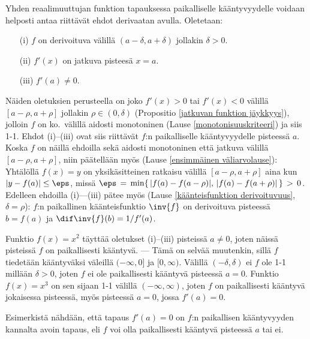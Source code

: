 Yhden reaalimuuttujan funktion tapauksessa paikalliselle kääntyvyydelle voidaan helposti antaa
riittävät ehdot derivaatan avulla. Oletetaan:
\begin{itemize}
\item[(i)]   $f$ on derivoituva välillä $(a-\delta,a+\delta)$ jollakin $\delta>0$.
\item[(ii)]  $f'(x)$ on jatkuva pisteesä $x=a$.
\item[(iii)] $f'(a) \neq 0$.
\end{itemize}
Näiden oletuksien perusteella on joko $f'(x)>0$ tai $f'(x)<0$ välillä $[a-\rho,a+\rho]$
jollakin $\rho\in(0,\delta)$ (Propositio \ref{jatkuvan funktion jäykkyys}), jolloin $f$ on
ko.\ välillä aidosti monotoninen (Lause \ref{monotonisuuskriteeri}) ja siis 1-1. Ehdot
(i)--(iii) ovat siis riittävät $f$:n paikalliselle kääntyvyydelle pisteessä $a$. Koska $f$ on
näillä ehdoilla sekä aidosti monotoninen että jatkuva välillä $[a-\rho,a+\rho]$, niin
päätellään myös (Lause \ref{ensimmäinen väliarvolause}): Yhtälöllä $f(x)=y$ on yksikäsitteinen
ratkaisu välillä $[a-\rho,a+\rho]$ aina kun $|y-f(a)|\le\eps$, missä
$\eps \,=\, \min\{\,|f(a)-f(a-\rho)|,\,|f(a)-f(a+\rho)|\,\} \,>\, 0$. Edelleen ehdoilla
(i)---(iii) pätee myös (Lause \ref{käänteisfunktion derivoituvuus}, $\delta=\rho$): $f$:n
paikallinen käänteisfunktio $\inv{f}$ on derivoituva pisteessä $b=f(a)$ ja
$\dif\inv{f}(b)=1/f'(a)$.
\begin{Exa} Funktio $f(x)=x^2$ täyttää oletukset (i)--(iii) pisteissä $a \neq 0$, joten näissä
pisteissä $f$ on paikallisesti kääntyvä. --- Tämä on selvää muutenkin, sillä $f$ tiedetään
kääntyväksi väleillä $(-\infty,0]$ ja $[0,\infty)$. Välillä $(-\delta,\delta)$ ei $f$ ole 1-1
millään $\delta>0$, joten $f$ ei ole paikallisesti kääntyvä pisteessä $a=0$. Funktio
$f(x)=x^3$ on sen sijaan 1-1 välillä $(-\infty,\infty)$, joten $f$ on paikallisesti kääntyvä
jokaisessa pisteessä, myös pisteessä $a=0$, jossa $f'(a)=0$. \loppu
\end{Exa}
Esimerkistä nähdään, että tapaus $f'(a)=0$ on $f$:n paikallisen kääntyvyyden kannalta avoin
tapaus, eli $f$ voi olla paikallisesti kääntyvä pisteessä $a$ tai ei.

\vspace{3mm}


